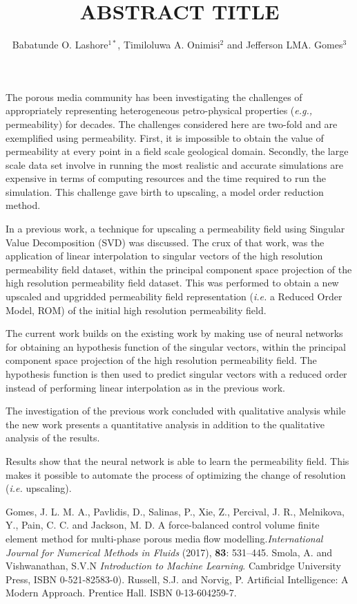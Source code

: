 \documentclass[a4paper]{wccm2020-abstract}
\title{ABSTRACT TITLE}
\author{Babatunde O. Lashore$^{1*}$, Timiloluwa A. Onimisi$^{2}$ and Jefferson LMA. Gomes$^{3}$}
\newcommand{\eg}{{\it e.g., }}
\begin{document}
\thispagestyle{empty}

The porous media community has been investigating the challenges of appropriately representing heterogeneous petro-physical properties (\eg permeability) for decades. The challenges considered here are two-fold and are exemplified using permeability. First, it is impossible to obtain the value of permeability at every point in a field scale geological domain. Secondly, the large scale data set involve in running the most realistic and accurate simulations are expensive in terms of computing resources and the time required to run the simulation. This challenge gave birth to upscaling, a model order reduction method.

In a previous work, a technique for upscaling a permeability field using Singular Value Decomposition (SVD) was discussed. The crux of that work, was the application of linear interpolation to singular vectors of the high resolution permeability field dataset, within the principal component space projection of the high resolution permeability field dataset. This was performed to obtain a new upscaled and upgridded permeability field representation ({\it i.e.} a Reduced Order Model, ROM) of the initial high resolution permeability field.

The current work builds on the existing work by making use of neural networks \cite{Smola_2008, Russell_2009} for obtaining an hypothesis function of the singular vectors, within the principal component space projection of the high resolution permeability field. The hypothesis function is then used to predict singular vectors with a reduced order instead of performing linear interpolation as in the previous work. 

The investigation of the previous work concluded with qualitative analysis while the new work presents a quantitative analysis in addition to the qualitative analysis of the results.

Results show that the neural network is able to learn the permeability field. This makes it possible to  automate the process of optimizing the change of resolution ({\it i.e.} upscaling). 

\begin{thebibliography}{99}
 Gomes, J. L. M. A., Pavlidis, D., Salinas, P., Xie, Z., Percival, J. R., Melnikova, Y., Pain, C. C. and Jackson, M. D. A force-balanced control volume finite element method for multi-phase porous media flow modelling.\textit{International Journal for Numerical Methods in Fluids} (2017), \textbf{83}: 531--445.
 Smola, A. and Vishwanathan, S.V.N \textit{Introduction to Machine Learning}. Cambridge University Press,
 ISBN 0-521-82583-0).
 Russell, S.J. and Norvig, P. Artificial Intelligence: A Modern Approach. Prentice Hall.
ISBN 0-13-604259-7.
\end{thebibliography}
\end{document}
